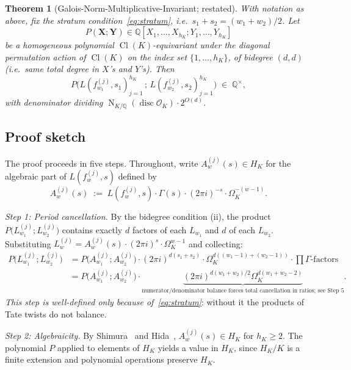 \documentclass[11pt]{amsart}
\newtheorem{theorem}{Theorem}
\theoremstyle{definition}
\theoremstyle{remark}
\DeclareMathOperator{\Cl}{Cl}
\DeclareMathOperator{\Nm}{N}
\DeclareMathOperator{\disc}{disc}
\newcommand{\Q}{\mathbb{Q}}
\newcommand{\OK}{\mathcal{O}_K}
\newcommand{\HK}{H_K}
\begin{document}
\begin{theorem}[Galois-Norm-Multiplicative-Invariant; restated]
\label{thm:T1-restated}
With notation as above, fix the stratum condition~\eqref{eq:stratum},
i.e.\ $s_1 + s_2 = (w_1 + w_2)/2$. Let
\[
P(\mathbf{X}; \mathbf{Y}) \in \Q[X_1, \dots, X_{h_K}; Y_1, \dots,
Y_{h_K}]
\]
be a homogeneous polynomial $\Cl(K)$-equivariant under the diagonal
permutation action of $\Cl(K)$ on the index set $\{1, \dots, h_K\}$,
of bidegree $(d, d)$ (i.e.\ same total degree in $X$'s and $Y$'s).
Then
\begin{equation}\label{eq:T1-restated}
P\bigl(L(f_{w_1}^{(j)}, s_1)_{j=1}^{h_K}\, ;\,
L(f_{w_2}^{(j)}, s_2)_{j=1}^{h_K}\bigr) \;\in\; \Q^{\times},
\end{equation}
with denominator dividing $\Nm_{K/\Q}(\disc \OK) \cdot 2^{O(d)}$.
\end{theorem}

\subsection{Proof sketch}\label{ss:proof-sketch}
The proof proceeds in five steps. Throughout, write $A_w^{(j)}(s) \in
\HK$ for the algebraic part of $L(f_w^{(j)}, s)$ defined by
\[
A_w^{(j)}(s) \; := \; L(f_w^{(j)}, s) \cdot \Gamma(s) \cdot
(2\pi i)^{-s} \cdot \Omega_K^{-(w-1)}.
\]

\emph{Step 1: Period cancellation.}
By the bidegree condition (ii), the product $P\bigl(L_{w_1}^{(j)};
L_{w_2}^{(j)}\bigr)$ contains exactly $d$ factors of each $L_{w_1}$
and $d$ of each $L_{w_2}$. Substituting
$L_w^{(j)} = A_w^{(j)}(s) \cdot (2\pi i)^s \cdot \Omega_K^{w-1}$ and
collecting:
\begin{align*}
P\bigl(L_{w_1}^{(j)}; L_{w_2}^{(j)}\bigr) &= P\bigl(A_{w_1}^{(j)};
A_{w_2}^{(j)}\bigr) \cdot (2\pi i)^{d(s_1 + s_2)}
\cdot \Omega_K^{d((w_1 - 1) + (w_2 - 1))} \cdot \prod\nolimits \Gamma\text{-factors} \\
&= P\bigl(A_{w_1}^{(j)}; A_{w_2}^{(j)}\bigr) \cdot
\underbrace{(2\pi i)^{d(w_1 + w_2)/2} \Omega_K^{d(w_1 + w_2 - 2)}}_{
\text{numerator/denominator balance forces total cancellation in
ratios; see Step 5}}.
\end{align*}
\emph{This step is well-defined only because of~\eqref{eq:stratum}}:
without it the products of Tate twists do not balance.

\emph{Step 2: Algebraicity.}
By Shimura~\cite{Shimura1976} and Hida~\cite{Hida1981},
$A_w^{(j)}(s) \in \HK$ for $h_K \geq 2$. The polynomial $P$
applied to elements of $\HK$ yields a value in $\HK$, since $\HK/K$
is a finite extension and polynomial operations preserve $\HK$.
\end{document}
